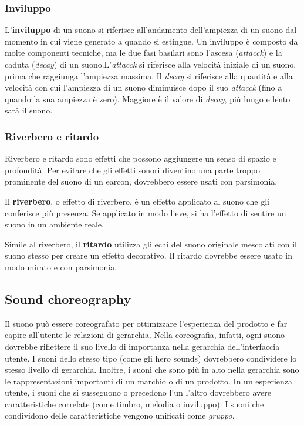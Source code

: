 \documentclass[12pt, a4paper]{report}
\begin{document}
                    \subsubsection{Inviluppo}
                    L'\textbf{inviluppo} di un suono si riferisce all'andamento dell'ampiezza di un suono dal momento in cui viene generato a quando si estingue. Un inviluppo è composto da molte componenti
                    tecniche, ma le due fasi basilari sono l'ascesa (\textit{attacck}) 	e la caduta (\textit{decay}) di un suono.L'\textit{attacck} si riferisce alla velocità iniziale di un suono, prima che
                    raggiunga l'ampiezza massima. Il \textit{decay} si riferisce alla quantità e alla velocità 	con cui l'ampiezza di un suono diminuisce dopo il suo \textit{attacck} (fino a quando la sua
                    ampiezza è zero). Maggiore è il valore di \textit{decay}, più lungo e lento sarà il suono.


                    \subsubsection{Riverbero e ritardo}
                    	Riverbero e ritardo sono effetti che possono aggiungere un senso di spazio e profondità. Per evitare che gli effetti sonori diventino una parte troppo prominente del suono di un earcon, dovrebbero essere usati con parsimonia.

                    	Il \textbf{riverbero}, o effetto di riverbero, è un effetto applicato al suono che gli conferisce più presenza. Se applicato in modo lieve, si ha l'effetto di sentire un suono in un ambiente reale.


                    	Simile al riverbero, il \textbf{ritardo} utilizza gli echi del suono originale mescolati con il suono stesso per creare un effetto decorativo. Il ritardo dovrebbe essere usato in modo mirato e con parsimonia.


                \subsection{Sound choreography}
                Il suono può essere coreografato per ottimizzare l'esperienza del prodotto  e far capire all'utente le relazioni  di gerarchia. Nella coreografia, infatti, ogni suono dovrebbe riflettere il suo livello di
                importanza nella gerarchia dell'interfaccia utente. I suoni dello stesso tipo (come gli hero sounds) dovrebbero condividere lo stesso livello di gerarchia. Inoltre, i suoni che sono più in alto nella
                gerarchia sono le rappresentazioni importanti di un marchio o di un prodotto. In un esperienza utente, i suoni che si susseguono o precedono l'un l'altro dovrebbero avere caratteristiche correlate
                (come timbro, melodia o inviluppo). I suoni che condividono delle caratteristiche vengono unificati come \textit{gruppo}.
\end{document}
